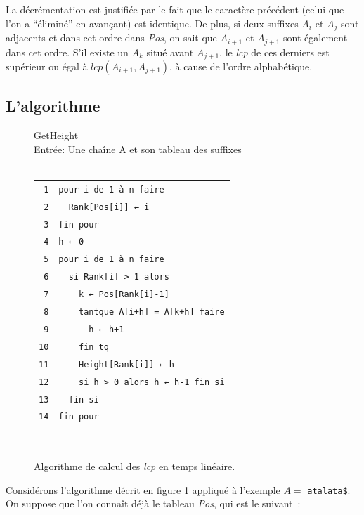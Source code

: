 \documentclass[a4paper,11pt]{article}
\begin{document}
La décrémentation est justifiée par le fait que le caractère précédent
(celui que l'on a ``éliminé'' en avançant) est identique. De plus, si
deux suffixes $A_i$ et $A_j$ sont adjacents et dans cet ordre dans
\textit{Pos}, on sait que $A_{i+1}$ et $A_{j+1}$ sont également dans
cet ordre. S'il existe un $A_k$ situé avant $A_{j+1}$, le \textit{lcp}
de ces derniers est supérieur ou égal à $\mathit{lcp}(A_{i+1},
A_{j+1})$, à cause de l'ordre alphabétique.


\subsection{L'algorithme}
\label{sec:algo}

\begin{figure}[h]
  GetHeight\\
  Entrée: Une chaîne A et son tableau des suffixes\\ \hfill \\
  \begin{tabular}{r|l}
    \texttt{1}  & \verb!pour i de 1 à n faire!\\
    \texttt{2}  & \verb!  Rank[Pos[i]] ← i!\\
    \texttt{3}  & \verb!fin pour!\\
    \texttt{4}  & \verb!h ← 0!\\
    \texttt{5}  & \verb!pour i de 1 à n faire!\\
    \texttt{6}  & \verb!  si Rank[i] > 1 alors!\\
    \texttt{7}  & \verb!    k ← Pos[Rank[i]-1]!\\
    \texttt{8}  & \verb!    tantque A[i+h] = A[k+h] faire!\\
    \texttt{9}  & \verb!      h ← h+1!\\
    \texttt{10} & \verb!    fin tq!\\
    \texttt{11} & \verb!    Height[Rank[i]] ← h!\\
    \texttt{12} & \verb!    si h > 0 alors h ← h-1 fin si!\\
    \texttt{13} & \verb!  fin si!\\
    \texttt{14} & \verb!fin pour!\\
  \end{tabular}\\
  \caption{Algorithme de calcul des \textit{lcp} en temps linéaire.}
  \label{fig:getheight}
\end{figure}

Considérons l'algorithme décrit en figure \ref{fig:getheight} appliqué
à l'exemple $A =$ \texttt{atalata\$}. On suppose que l'on connaît déjà
le tableau \textit{Pos}, qui est le suivant~:
\end{document}

